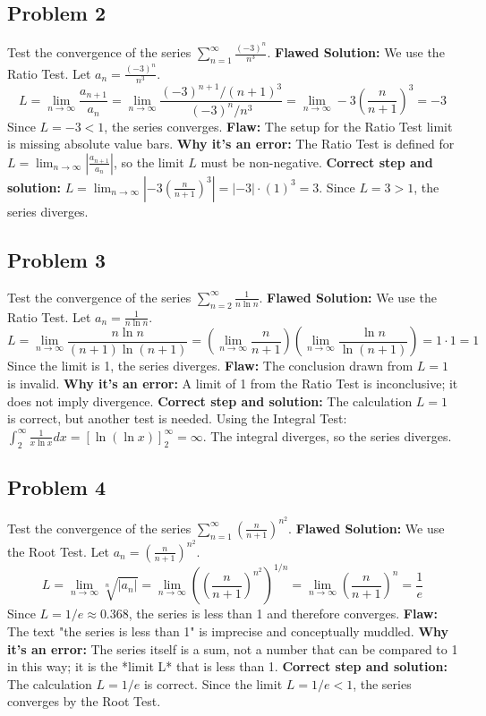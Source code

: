\documentclass{article}
\begin{document}
\subsection*{Problem 2}
Test the convergence of the series $\sum_{n=1}^{\infty} \frac{(-3)^n}{n^3}$.
\textbf{Flawed Solution:}
We use the Ratio Test. Let $a_n = \frac{(-3)^n}{n^3}$.
\[ L = \lim_{n \to \infty} \frac{a_{n+1}}{a_n} = \lim_{n \to \infty} \frac{(-3)^{n+1}/(n+1)^3}{(-3)^n/n^3} = \lim_{n \to \infty} -3 \left(\frac{n}{n+1}\right)^3 = -3 \]
Since $L = -3 < 1$, the series converges.
\textbf{Flaw:} The setup for the Ratio Test limit is missing absolute value bars. \textbf{Why it's an error:} The Ratio Test is defined for $L = \lim_{n \to \infty} |\frac{a_{n+1}}{a_n}|$, so the limit $L$ must be non-negative. \textbf{Correct step and solution:} $L = \lim_{n \to \infty} \left| -3 \left(\frac{n}{n+1}\right)^3 \right| = |-3| \cdot (1)^3 = 3$. Since $L=3>1$, the series diverges.

\subsection*{Problem 3}
Test the convergence of the series $\sum_{n=2}^\infty \frac{1}{n \ln n}$.
\textbf{Flawed Solution:}
We use the Ratio Test. Let $a_n = \frac{1}{n \ln n}$.
\[ L = \lim_{n \to \infty} \frac{n \ln n}{(n+1)\ln(n+1)} = \left(\lim_{n \to \infty} \frac{n}{n+1}\right) \left(\lim_{n \to \infty} \frac{\ln n}{\ln(n+1)}\right) = 1 \cdot 1 = 1 \]
Since the limit is 1, the series diverges.
\textbf{Flaw:} The conclusion drawn from $L=1$ is invalid. \textbf{Why it's an error:} A limit of 1 from the Ratio Test is inconclusive; it does not imply divergence. \textbf{Correct step and solution:} The calculation $L=1$ is correct, but another test is needed. Using the Integral Test: $\int_2^\infty \frac{1}{x \ln x} dx = [\ln(\ln x)]_2^\infty = \infty$. The integral diverges, so the series diverges.

\subsection*{Problem 4}
Test the convergence of the series $\sum_{n=1}^\infty \left( \frac{n}{n+1} \right)^{n^2}$.
\textbf{Flawed Solution:}
We use the Root Test. Let $a_n = \left( \frac{n}{n+1} \right)^{n^2}$.
\[ L = \lim_{n \to \infty} \sqrt[n]{|a_n|} = \lim_{n \to \infty} \left( \left( \frac{n}{n+1} \right)^{n^2} \right)^{1/n} = \lim_{n \to \infty} \left( \frac{n}{n+1} \right)^n = \frac{1}{e} \]
Since $L=1/e \approx 0.368$, the series is less than 1 and therefore converges.
\textbf{Flaw:} The text "the series is less than 1" is imprecise and conceptually muddled. \textbf{Why it's an error:} The series itself is a sum, not a number that can be compared to 1 in this way; it is the *limit L* that is less than 1. \textbf{Correct step and solution:} The calculation $L=1/e$ is correct. Since the limit $L=1/e < 1$, the series converges by the Root Test.
\end{document}
